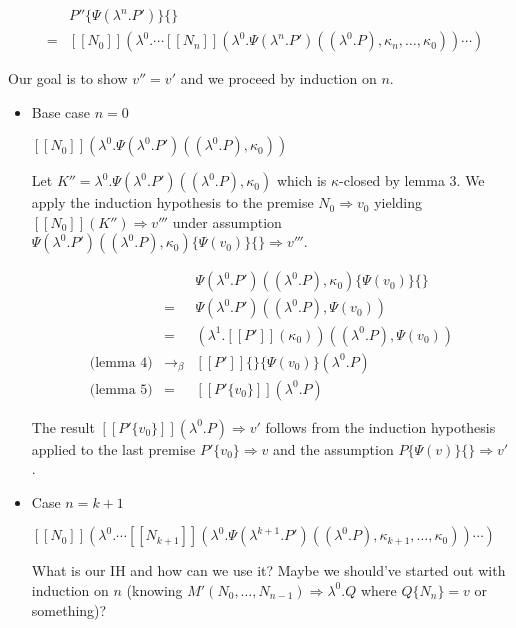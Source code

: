 \documentclass[a4paper,11pt]{article}
\begin{document}
\begin{itemize}
\begin{eqnarray*}
&   & P''\{\Psi(\lambda^{n}.P')\}\{\} \\
& = & [\![N_{0}]\!](\lambda^{0}. \cdots [\![N_{n}]\!](\lambda^{0}.\Psi(\lambda^{n}.P')((\lambda^{0}.P), \kappa_{n}, \ldots, \kappa_{0})) \cdots )
\end{eqnarray*}

Our goal is to show $v'' = v'$ and we proceed by induction on $n$.

\begin{itemize}
\item{Base case $n = 0$}

$[\![N_{0}]\!](\lambda^{0}.\Psi(\lambda^{0}.P')((\lambda^{0}.P), \kappa_{0}))$

Let $K'' = \lambda^{0}.\Psi(\lambda^{0}.P')((\lambda^{0}.P), \kappa_{0})$ which is $\kappa$-closed by lemma 3. We apply the induction hypothesis to the premise $N_{0} \Rightarrow v_{0}$ yielding $[\![N_{0}]\!](K'') \Rightarrow v'''$ under assumption $\Psi(\lambda^{0}.P')((\lambda^{0}.P), \kappa_{0})\{\Psi(v_{0})\}\{\} \Rightarrow v'''$.

\begin{eqnarray*}
 &   & \Psi(\lambda^{0}.P')((\lambda^{0}.P), \kappa_{0})\{\Psi(v_{0})\}\{\} \\
 & = & \Psi(\lambda^{0}.P')((\lambda^{0}.P), \Psi(v_{0})) \\
 & = & (\lambda^{1}.[\![P']\!](\kappa_{0}))((\lambda^{0}.P), \Psi(v_{0})) \\
\mbox{(lemma 4)} & \rightarrow_{\beta} & [\![P']\!]\{\}\{\Psi(v_{0})\} (\lambda^{0}.P) \\
\mbox{(lemma 5)} & = & [\![P'\{v_{0}\}]\!] (\lambda^{0}.P)
\end{eqnarray*}

The result $[\![P'\{v_{0}\}]\!] (\lambda^{0}.P) \Rightarrow v'$
follows from the induction hypothesis applied to the last premise
$P'\{v_{0}\} \Rightarrow v$ and the assumption $P\{\Psi(v)\}\{\}
\Rightarrow v'$.


\item{Case $n = k + 1$}

$[\![N_{0}]\!](\lambda^{0}. \cdots [\![N_{k+1}]\!](\lambda^{0}.\Psi(\lambda^{k+1}.P')((\lambda^{0}.P), \kappa_{k+1}, \ldots, \kappa_{0})) \cdots )$

What is our IH and how can we use it? Maybe we should've started out with induction on $n$ (knowing $M'(N_{0}, \ldots, N_{n-1}) \Rightarrow \lambda^{0}.Q$ where $Q\{N_{n}\} = v$ or something)?



\end{itemize}
\end{itemize}
\end{document}
